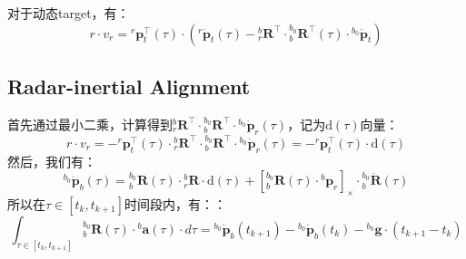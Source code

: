 \documentclass[12pt, onecolumn]{article}
\newcommand\liehat[1]{\left[ #1 \right]_\times}
\newcommand\bsm[1]{\boldsymbol{\mathrm{#1}}}
\begin{document}
	对于动态target，有：
	\begin{equation}
	r\cdot v_r=
	{^{r}\boldsymbol{p}_t^\top(\tau)}\cdot
	\left( 
	{^{r}\dot{\boldsymbol{p}}_t(\tau)}-
	{^{b}_{r}\boldsymbol{R}^\top}\cdot{^{b_0}_{b}\boldsymbol{R}^\top(\tau)}\cdot
	{^{b_0}\dot{\boldsymbol{p}}_t}
	\right) 
	\end{equation}
	
	\subsection{Radar-inertial Alignment}
	首先通过最小二乘，计算得到${^{b}_{r}\boldsymbol{R}^\top}\cdot{^{b_0}_{b}\boldsymbol{R}^\top}\cdot{^{b_0}\dot{\boldsymbol{p}}_r(\tau)}$，记为$\bsm{d}(\tau)$向量：
	\begin{equation}
	r\cdot v_r=-
	{^{r}\boldsymbol{p}_t^\top(\tau)}\cdot{^{b}_{r}\boldsymbol{R}^\top}\cdot{^{b_0}_{b}\boldsymbol{R}^\top}\cdot{^{b_0}\dot{\boldsymbol{p}}_r(\tau)}
	=-{^{r}\boldsymbol{p}_t^\top(\tau)}\cdot\bsm{d}(\tau)
	\end{equation}
	然后，我们有：
	\begin{equation}
	{^{b_0}\dot{\boldsymbol{p}}_b(\tau)}={^{b_0}_{b}\boldsymbol{R}}(\tau)\cdot{^{b}_{r}\boldsymbol{R}}\cdot\bsm{d}(\tau)
	+\liehat{{^{b_0}_{b}\boldsymbol{R}(\tau)}\cdot{^{b}{\boldsymbol{p}}_r}}\cdot{^{b_0}_{b}\dot{\boldsymbol{R}}(\tau)}
	\end{equation}
	所以在$\tau\in[t_k,t_{k+1}]$时间段内，有：：
	\begin{equation}
	\int_{\tau\in[t_k,t_{k+1}]}{^{b_0}_{b}\boldsymbol{R}(\tau)}\cdot{^{b}\boldsymbol{a}(\tau)}\cdot d\tau=
	{^{b_0}\dot{\boldsymbol{p}}_b(t_{k+1})}-{^{b_0}\dot{\boldsymbol{p}}_b(t_k)}
	-{^{b_0}\boldsymbol{g}}\cdot (t_{k+1}-t_k)
	\end{equation}
	
\end{document}
